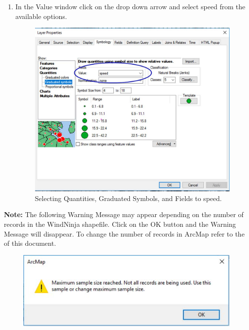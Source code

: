 \documentclass[12pt]{article}
\begin{document}
\begin{enumerate}
\item In the Value window click on the drop down arrow and select speed from the available options.

\begin{figure}[H]
	\centering
	\includegraphics[scale=0.3]{arc_5.png}
	\caption{Selecting Quantities, Graduated Symbols, and Fields to speed.}
\label{fig:Figure5}
\end{figure}
\end{enumerate}
\textbf{Note: }The following Warning Message may appear depending on the number of records in the WindNinja shapefile.
Click on the OK button and the Warning Message will disappear. To change the number of records in ArcMap refer
to the~ of this document.

\begin{figure}[H]
	\centering
	\includegraphics[scale=0.5]{arc_5_1.png}
\label{fig:Figure5_1}
\end{figure}
\end{document}
